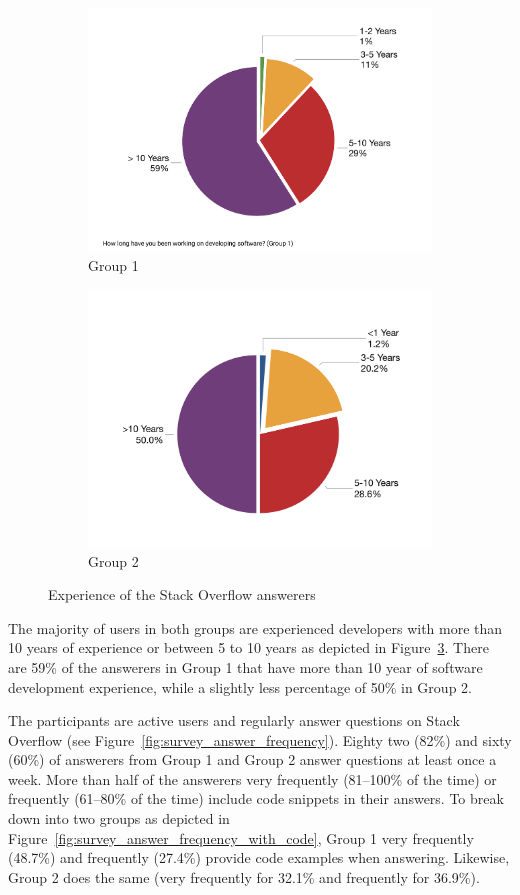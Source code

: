 \documentclass{svjour3}                     %
\begin{document}
\begin{figure}
	\begin{subfigure}{.5\textwidth}
		\centering
		\includegraphics[width=0.8\linewidth]{survey_exp_1}
		\caption{Group 1}
		\label{fig:survey_group1_exp}
	\end{subfigure}%
	\begin{subfigure}{.5\textwidth}
		\centering
		\includegraphics[width=0.8\linewidth]{survey_exp_2}
		\caption{Group 2}
		\label{fig:survey_group2_exp}
	\end{subfigure}
	\caption{Experience of the Stack Overflow answerers}
	\label{fig:survey_exp}
\end{figure}

The majority of users in both groups are experienced developers with more than
10 years of experience or between 5 to 10 years as depicted in
Figure~\ref{fig:survey_exp}. There are 59\% of the answerers in Group 1 that
have more than 10 year of software development experience, while a slightly less
percentage of 50\% in Group 2.

The participants are active users and regularly answer questions on Stack
Overflow (see Figure~\ref{fig:survey_answer_frequency}). Eighty two (82\%) and
sixty (60\%) of answerers from Group 1 and Group 2  answer questions at
least once a week.
More than half of the answerers very frequently (81--100\% of the time) or
frequently (61--80\% of the time) include code snippets in their answers. To
break down into two groups as depicted in
Figure~\ref{fig:survey_answer_frequency_with_code}, Group 1 very frequently
(48.7\%) and frequently (27.4\%) provide code examples when answering. Likewise,
Group 2 does the same (very frequently for 32.1\% and frequently for 36.9\%).
\end{document}
